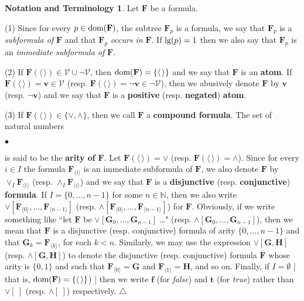 \documentclass[copyright,creativecommons]{eptcs}
\newcommand{\vv}{\langle}
\newcommand{\ww}{\rangle}
\newcommand{\NN}{\mathbb{N}}
\newcommand{\eqdef}{\stackrel{\text{\tiny \textnormal{DEF}}}{=}}
\newcommand{\st}{ \ \ \big{|} \ \ }
\newcommand{\roo}{\vv \, \ww}
\newcommand{\cV}{\mathcal{V}}
\newcommand{\arnn}[2]{\textstyle\wedge_{#2} \bF_{#1}}
\newcommand{\TRUE}{\pmb{t}}
\newcommand{\FALSE}{\pmb{f}}
\newcommand{\bF}{\mathbf{F}}
\newcommand{\bG}{\mathbf{G}}
\newcommand{\bH}{\mathbf{H}}
\newcommand{\bbv}{\mathbf{v}}
\newcommand{\len}{\textnormal{lg}}
\newcommand{\dom}{\ensuremath{\textnormal{dom}}}
\theoremstyle{definition}
\newtheorem{notation}[theorem]{Notation and Terminology}{\bfseries}{}
\newcommand{\squishlist}{
 \begin{list}{$\bullet$}
  { \setlength{\itemsep}{0pt}
     \setlength{\parsep}{3pt}
     \setlength{\topsep}{3pt}
     \setlength{\partopsep}{0pt}
     \setlength{\leftmargin}{1em}
     \setlength{\labelwidth}{1.5em}
     \setlength{\labelsep}{0.5em} } }
\newcommand{\squishend}{
  \end{list}  }
\begin{document}
\begin{notation}
Let $\bF$ be a formula.

(1) Since
for every $p \in \dom(\bF)$, the  subtree
$\bF_p$ is a formula, we say that
$\bF_p$ is a \emph{subformula of} $\bF$ and that $\bF_p$ \emph{occurs in} $\bF$. If
$\len(p) =1$ then we also say that
$\bF_p$ is an \emph{immediate subformula of} $\bF$.

(2) If  $\bF(\roo)  \in \cV \cup \neg \cV$,  then $\dom(\bF) = \{\roo\}$
and we say that $\bF$ is an \textbf{atom}.
If  $\bF(\roo) = \bbv \in \cV$ (resp. $\bF(\roo) = \neg \bbv \in \neg \cV$),  then we abusively   denote $\bF$ by $\bbv$ (resp. $\neg \bbv$) and we  say that $\bF$ is  a \textbf{positive} (resp. \textbf{negated}) \textbf{atom}.

(3) If ${\bF}(\roo)  \in \{ \vee, \wedge\}$, then we call $\bF$  a \textbf{compound formula}. The set of natural numbers
\squishlist
\item[] \centering{$I \ \eqdef \ \{i \in \NN \st \vv i \ww \in \dom(\bF) \}$ \par}
\squishend
\noindent is said to be the \textbf{arity of}  $\bF$.
Let $\bF(\roo) = \vee$ (resp. $\bF(\roo) = \wedge$). Since for every $i \in I$ the formula $\bF_{\vv i \ww}$ is
an immediate subformula of $\bF$, we also denote $\bF$ by
  $ \vee_I \bF_{\vv i \ww} $
(resp.  $\arnn{\vv i \ww}{I}$)
and we say that  $\bF$ is a
\textbf{disjunctive} (resp. \textbf{conjunctive}) \textbf{formula}.
If $I = \{0,\ldots,n-1\}$ for some $n \in \NN$,
 then
we also write $\vee [ \bF_{\vv 0 \ww},\ldots, \bF_{\vv n-1 \ww} ]$
(resp. $\wedge [ \bF_{\vv 0 \ww},\ldots, \bF_{\vv n-1 \ww} ]$)
for $\bF$.
Obviously, if we write  something like ``let $\bF$ be  $
\vee [ \bG_0,\ldots, \bG_{n-1} ]$ \ldots " (resp.
$\wedge [ \bG_0,\ldots, \bG_{n-1} ]$), then
we mean that $\bF$ is a disjunctive (resp. conjunctive)
 formula of arity $\{0,\ldots, n-1\}$ and that $\bG_k = \bF_{\vv k \ww}$, for each $k < n$.
Similarly, we may use the expression $\vee[\bG,\bH]$ (resp. $\wedge[\bG,\bH]$) to denote the disjunctive (resp. conjunctive) formula
$\bF$ whose arity is $\{0,1\}$ and such that $\bF_{\vv 0 \ww} = \bG$ and
 $\bF_{\vv 1 \ww} = \bH$, and so on.
 Finally, if
$I  = \emptyset$ | that is, $\dom(\bF) = \{\roo\}$) |
then we write $\FALSE$ (for \emph{false}) and  $\TRUE$ (for \emph{true})
rather than $\vee [ \ ]$ (resp. $\wedge [ \ ]$) respectively.
 \hfill$\triangle$


\end{notation}
\end{document}
